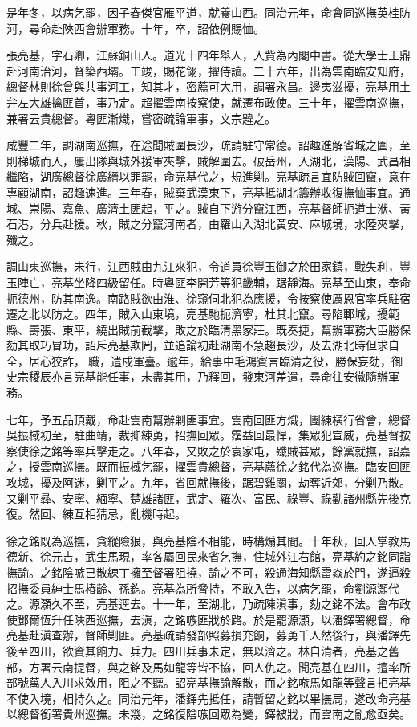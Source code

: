 \begin{pinyinscope}
是年冬，以病乞罷，因子春傑官雁平道，就養山西。同治元年，命會同巡撫英桂防河，尋命赴陜西會辦軍務。十年，卒，詔依例賜恤。

張亮基，字石卿，江蘇銅山人。道光十四年舉人，入貲為內閣中書。從大學士王鼎赴河南治河，督築西壩。工竣，賜花翎，擢侍讀。二十六年，出為雲南臨安知府，總督林則徐曾與共事河工，知其才，密薦可大用，調署永昌。邊夷滋擾，亮基用土弁左大雄擒匪首，事乃定。超擢雲南按察使，就遷布政使。三十年，擢雲南巡撫，兼署云貴總督。粵匪漸熾，嘗密疏論軍事，文宗韙之。

咸豐二年，調湖南巡撫，在途聞賊圍長沙，疏請駐守常德。詔趣進解省城之圍，至則梯城而入，屢出隊與城外援軍夾擊，賊解圍去。破岳州，入湖北，漢陽、武昌相繼陷，湖廣總督徐廣縉以罪罷，命亮基代之，規進剿。亮基疏言宜防賊回竄，意在專顧湖南，詔趣速進。三年春，賊棄武漢東下，亮基抵湖北籌辦收復撫恤事宜。通城、崇陽、嘉魚、廣濟土匪起，平之。賊自下游分竄江西，亮基督師扼道士洑、黃石港，分兵赴援。秋，賊之分竄河南者，由羅山入湖北黃安、麻城境，水陸夾擊，殲之。

調山東巡撫，未行，江西賊由九江來犯，令道員徐豐玉御之於田家鎮，戰失利，豐玉陣亡，亮基坐降四級留任。時粵匪李開芳等犯畿輔，踞靜海。亮基至山東，奉命扼德州，防其南逸。南路賊欲由淮、徐窺伺北犯為應援，令按察使厲恩官率兵駐宿遷之北以防之。四年，賊入山東境，亮基馳扼濟寧，杜其北竄。尋陷鄆城，擾範縣、壽張、東平，繞出賊前截擊，敗之於臨清黑家莊。既奏捷，幫辦軍務大臣勝保劾其取巧冒功，詔斥亮基欺罔，並追論初赴湖南不急趨長沙，及去湖北時但求自全，居心狡詐，職，遣戍軍臺。逾年，給事中毛鴻賓言臨清之役，勝保妄劾，御史宗稷辰亦言亮基能任事，未盡其用，乃釋回，發東河差遣，尋命往安徽隨辦軍務。

七年，予五品頂戴，命赴雲南幫辦剿匪事宜。雲南回匪方熾，團練橫行省會，總督吳振棫初至，駐曲靖，裁抑練勇，招撫回眾。霑益回最悍，集眾犯宣威，亮基督按察使徐之銘等率兵擊走之。八年春，又敗之於袁家屯，殲賊甚眾，餘黨就撫，詔嘉之，授雲南巡撫。既而振棫乞罷，擢雲貴總督，亮基薦徐之銘代為巡撫。臨安回匪攻城，擾及阿迷，剿平之。九年，省回就撫後，踞碧雞關，劫奪近郊，分剿乃散。又剿平彞、安寧、緬寧、楚雄諸匪，武定、羅次、富民、祿豐、祿勸諸州縣先後克復。然回、練互相猜忌，亂機時起。

徐之銘既為巡撫，貪縱險狠，與亮基陰不相能，時構煽其間。十年秋，回人掌教馬德新、徐元吉，武生馬現，率各屬回民來省乞撫，住城外江右館，亮基約之銘同詣撫諭。之銘陰嗾已散練丁擁至督署阻撓，諭之不可，殺通海知縣雷焱於門，遂逼殺招撫委員紳士馬椿齡、孫鈞。亮基為所脅持，不敢入告，以病乞罷，命劉源灝代之。源灝久不至，亮基逕去。十一年，至湖北，乃疏陳滇事，劾之銘不法。會布政使鄧爾恆升任陜西巡撫，去滇，之銘嗾匪戕於路。於是罷源灝，以潘鐸署總督，命亮基赴滇查辦，督師剿匪。亮基疏請發部照募損充餉，募勇千人然後行，與潘鐸先後至四川，欲資其餉力、兵力。四川兵事未定，無以濟之。林自清者，亮基之舊部，方署云南提督，與之銘及馬如龍等皆不協，回人仇之。聞亮基在四川，擅率所部號萬人入川求效用，阻之不聽。詔亮基撫諭解散，而之銘嗾馬如龍等聲言拒亮基不使入境，相持久之。同治元年，潘鐸先抵任，請暫留之銘以畢撫局，遂改命亮基以總督銜署貴州巡撫。未幾，之銘復陰嗾回眾為變，鐸被戕，而雲南之亂愈亟矣。


\end{pinyinscope}
